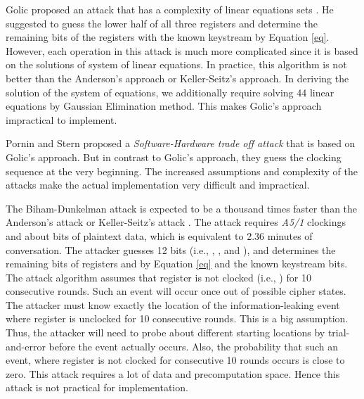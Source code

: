 \documentclass{llncs}
\begin{document}
Golic proposed an attack that has a complexity of  linear equations sets \cite{[Golic]}. He suggested to guess the lower half of all three registers and determine the remaining bits of the registers with the known keystream by Equation \ref{eq}. However, each operation in this attack is much more complicated since it is based on the solutions of system of linear equations. In practice, this algorithm is not better than the Anderson's approach \cite{[And]} or Keller-Seitz's \cite{[KS01]} approach. In deriving the solution of the system of equations, we additionally require solving 44 linear equations by Gaussian Elimination method. This makes Golic's approach impractical to implement.

Pornin and Stern \cite{[Porn]} proposed a \emph{Software-Hardware trade off attack} that is based on Golic's approach. But in contrast to Golic's approach, they guess the clocking sequence at the very beginning. The increased assumptions and complexity of the attacks make the actual implementation very difficult and impractical.

The Biham-Dunkelman attack \cite{[BD]} is expected to be a thousand times faster than the Anderson's attack \cite{[BD]} or Keller-Seitz's attack \cite{[KS01]}. The attack requires  \emph{A5/1} clockings and about  bits of plaintext data, which is equivalent to 2.36 minutes of conversation. The attacker guesses 12 bits (i.e., , ,  and ), and determines the remaining bits of registers  and  by Equation \ref{eq} and the known keystream bits. The attack algorithm assumes that register  is not clocked (i.e., ) for 10 consecutive rounds.  Such an event will occur once out of  possible cipher states. The attacker must know exactly the location of the information-leaking event where register  is unclocked for 10 consecutive rounds. This is a big assumption. Thus, the attacker will need to probe about  different starting locations by trial-and-error before the event actually occurs. Also, the probability that such an event, where register  is not clocked for consecutive 10 rounds occurs is close to zero. This attack requires a lot of data and precomputation space. Hence this attack is not practical for implementation.
\end{document}
